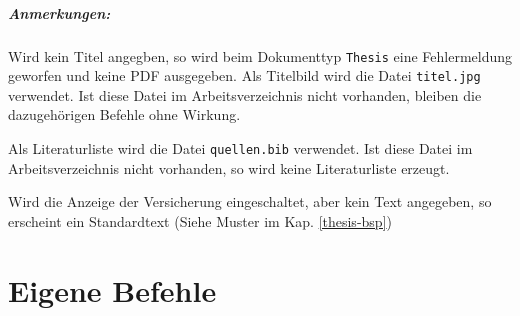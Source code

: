 			\paragraph*{Anmerkungen:}
			\begin{enumeratealpha}
				\item
					Wird kein Titel angegben, so wird beim Dokumenttyp \texttt{Thesis} eine Fehlermeldung geworfen und keine PDF ausgegeben.
					Als Titelbild wird die Datei \texttt{titel.jpg} verwendet.
					Ist diese Datei im Arbeitsverzeichnis nicht vorhanden, bleiben die dazugehörigen Befehle ohne Wirkung.
				\item
					Als Literaturliste wird die Datei \texttt{quellen.bib} verwendet.
					Ist diese Datei im Arbeitsverzeichnis nicht vorhanden, so wird keine Literaturliste erzeugt.
				\item
					Wird die Anzeige der Versicherung eingeschaltet, aber kein Text angegeben, so erscheint ein Standardtext (Siehe Muster im Kap. \vref{thesis-bsp})

			\end{enumeratealpha}




	\chapter{Eigene Befehle}
